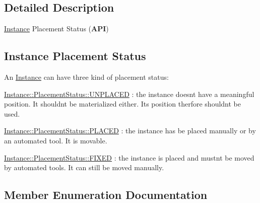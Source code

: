 \subsection{Detailed Description}
\mbox{\hyperlink{classHurricane_1_1Instance}{Instance}} Placement Status ({\bfseries A\+PI}) 

\hypertarget{classHurricane_1_1Instance_1_1PlacementStatus_secInstancePStatus}{}\subsection{Instance Placement Status}\label{classHurricane_1_1Instance_1_1PlacementStatus_secInstancePStatus}
An \mbox{\hyperlink{classHurricane_1_1Instance}{Instance}} can have three kind of placement status\+:
\begin{DoxyItemize}
\item \mbox{\hyperlink{classHurricane_1_1Instance_1_1PlacementStatus_af76cc0838783b3eb3a515eb3c3e0f7bfa3e19a0a1b3e8c8fd860164df7f935216}{Instance\+::\+Placement\+Status\+::\+U\+N\+P\+L\+A\+C\+ED}} \+: the instance doesn\textquotesingle{}t have a meaningful position. It shouldn\textquotesingle{}t be materialized either. It\textquotesingle{}s position therfore shouldn\textquotesingle{}t be used.
\item \mbox{\hyperlink{classHurricane_1_1Instance_1_1PlacementStatus_af76cc0838783b3eb3a515eb3c3e0f7bfaf3589c11ecd7d5de63db24826b74d457}{Instance\+::\+Placement\+Status\+::\+P\+L\+A\+C\+ED}} \+: the instance has be placed manually or by an automated tool. It is movable.
\item \mbox{\hyperlink{classHurricane_1_1Instance_1_1PlacementStatus_af76cc0838783b3eb3a515eb3c3e0f7bfa47be8a40f04081635fe24485ae7c6bd7}{Instance\+::\+Placement\+Status\+::\+F\+I\+X\+ED}} \+: the instance is placed and mustn\textquotesingle{}t be moved by automated tools. It can still be moved manually. 
\end{DoxyItemize}

\subsection{Member Enumeration Documentation}
\mbox{\label{classHurricane_1_1Instance_1_1PlacementStatus_af76cc0838783b3eb3a515eb3c3e0f7bf}} 
